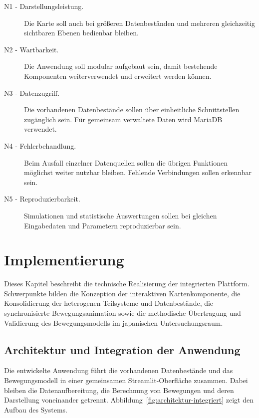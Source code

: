 \documentclass[12pt,a4paper]{report}
\begin{document}
\begin{description}

    \item[N1 - Darstellungsleistung.]
    Die Karte soll auch bei größeren Datenbeständen und mehreren
    gleichzeitig sichtbaren Ebenen bedienbar bleiben.

    \item[N2 - Wartbarkeit.]
    Die Anwendung soll modular aufgebaut sein, damit bestehende
    Komponenten weiterverwendet und erweitert werden können.

    \item[N3 - Datenzugriff.]
    Die vorhandenen Datenbestände sollen über einheitliche
    Schnittstellen zugänglich sein. Für gemeinsam verwaltete
    Daten wird MariaDB verwendet.

    \item[N4 - Fehlerbehandlung.]
    Beim Ausfall einzelner Datenquellen sollen die übrigen Funktionen
    möglichst weiter nutzbar bleiben. Fehlende Verbindungen sollen
    erkennbar sein.

    \item[N5 - Reproduzierbarkeit.]
    Simulationen und statistische Auswertungen sollen bei gleichen
    Eingabedaten und Parametern reproduzierbar sein.

\end{description}


\chapter{Implementierung}
\label{chap:implementierung}

Dieses Kapitel beschreibt die technische Realisierung der integrierten Plattform.
Schwerpunkte bilden die Konzeption der interaktiven Kartenkomponente, die Konsolidierung
der heterogenen Teilsysteme und Datenbestände, die synchronisierte
Bewegungsanimation sowie die methodische Übertragung und Validierung des
Bewegungsmodells im japanischen Untersuchungsraum.



\section{Architektur und Integration der Anwendung}
\label{sec:architektur-integriert}

Die entwickelte Anwendung führt die vorhandenen Datenbestände und das Bewegungsmodell in einer gemeinsamen Streamlit-Oberfläche zusammen. Dabei bleiben die Datenaufbereitung, die Berechnung von Bewegungen und deren Darstellung voneinander getrennt. Abbildung~\ref{fig:architektur-integriert} zeigt den Aufbau des Systems.
\end{document}
